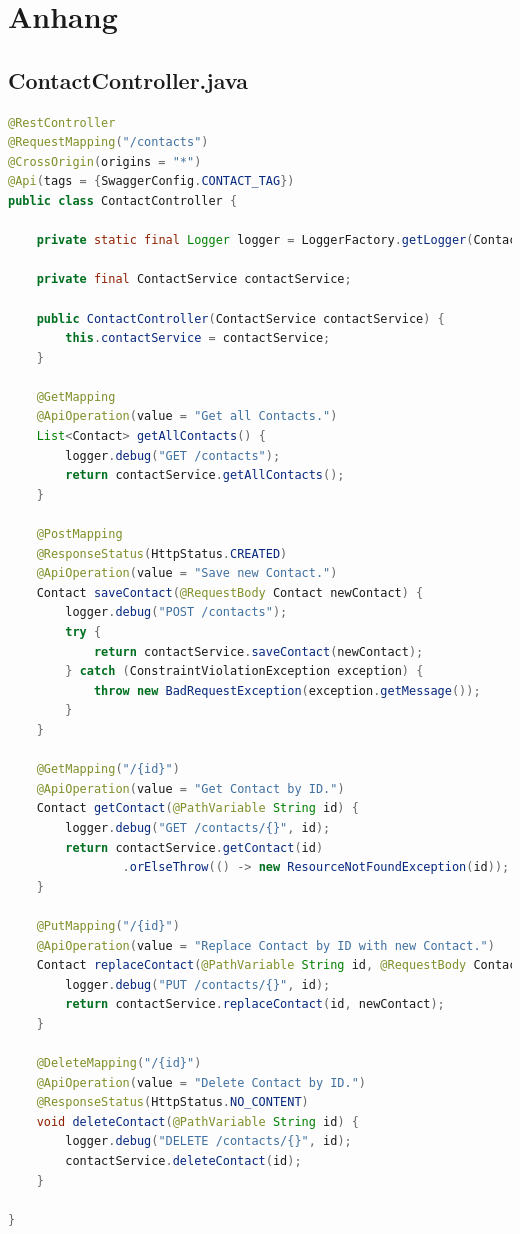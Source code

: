 \section*{Anhang}

\appendix

\subsection*{ContactController.java}

\begin{lstlisting}[language=java]
@RestController
@RequestMapping("/contacts")
@CrossOrigin(origins = "*")
@Api(tags = {SwaggerConfig.CONTACT_TAG})
public class ContactController {

    private static final Logger logger = LoggerFactory.getLogger(ContactApplication.class);

    private final ContactService contactService;

    public ContactController(ContactService contactService) {
        this.contactService = contactService;
    }

    @GetMapping
    @ApiOperation(value = "Get all Contacts.")
    List<Contact> getAllContacts() {
        logger.debug("GET /contacts");
        return contactService.getAllContacts();
    }

    @PostMapping
    @ResponseStatus(HttpStatus.CREATED)
    @ApiOperation(value = "Save new Contact.")
    Contact saveContact(@RequestBody Contact newContact) {
        logger.debug("POST /contacts");
        try {
            return contactService.saveContact(newContact);
        } catch (ConstraintViolationException exception) {
            throw new BadRequestException(exception.getMessage());
        }
    }

    @GetMapping("/{id}")
    @ApiOperation(value = "Get Contact by ID.")
    Contact getContact(@PathVariable String id) {
        logger.debug("GET /contacts/{}", id);
        return contactService.getContact(id)
                .orElseThrow(() -> new ResourceNotFoundException(id));
    }

    @PutMapping("/{id}")
    @ApiOperation(value = "Replace Contact by ID with new Contact.")
    Contact replaceContact(@PathVariable String id, @RequestBody Contact newContact) {
        logger.debug("PUT /contacts/{}", id);
        return contactService.replaceContact(id, newContact);
    }

    @DeleteMapping("/{id}")
    @ApiOperation(value = "Delete Contact by ID.")
    @ResponseStatus(HttpStatus.NO_CONTENT)
    void deleteContact(@PathVariable String id) {
        logger.debug("DELETE /contacts/{}", id);
        contactService.deleteContact(id);
    }

}
\end{lstlisting}

